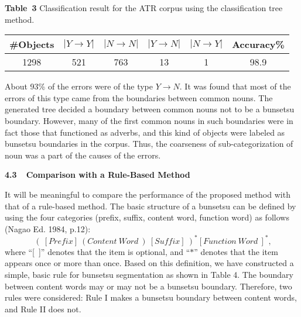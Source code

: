 \vspace{10pt}
\begin{center}
{\bf Table\ 3} Classification  result for the ATR corpus using the
classification tree method.
\vspace{10mm}\\
\small
\begin{tabular}{c|c|c|c|c|c}
\#Objects&$|Y\rightarrow Y|$&$|N\rightarrow N|$&$|Y\rightarrow N|$&
$|N\rightarrow Y|$&Accuracy\%\\ \hline
1298&521&763&13&1&98.9
\end{tabular}
\end{center}
\vspace{10pt}
\normalsize
About 93\% of the errors were of the type $Y\rightarrow N$.
It was found that most of the errors of this type came from
the boundaries   between  common nouns. The generated tree 
decided a boundary  between common nouns not to be a bunsetsu
boundary. However, many of the first common nouns
in such boundaries  were in fact those that
functioned as adverbs, and this kind of objects were labeled as
 bunsetsu boundaries in the corpus. Thus, the coarseness of 
sub-categorization of noun was a part of the causes of the errors.
\begin{flushleft}
{\large \bf 4.3\ \ Comparison with a  Rule-Based Method  }
\end{flushleft}
It will be meaningful to compare
the performance of the proposed method with that of a rule-based
method. The basic structure of a bunsetsu can be defined by using
the four categories (prefix, suffix, content word, function word) 
as follows (Nagao Ed. 1984, p.12):
\[\ (\ [Prefix]\ (Content\ Word\ )\ [Suffix]\ )^*[Function\ Word\
]^*,\]
where ``[\ ]'' denotes  that the item is optional, 
 and ``$*$''  denotes that the item appears once or 
more than once. Based on this definition, we have constructed  a simple,
basic rule for bunsetsu segmentation as  shown in Table 4.
The boundary between content words  may or may not be a bunsetsu
boundary. Therefore, two rules were considered: Rule I makes a
bunsetsu boundary between content words, and Rule II does not.\\
